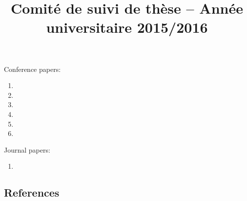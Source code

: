 \documentclass[10pt]{extarticle}
\title{Comité de suivi de thèse – Année universitaire 2015/2016}
\date{\vspace{-10ex}}
\begin{document}
Conference papers:
\begin{enumerate}
	\itemsep 5pt
    \item {}
    \item {}
    \item {}
    \item {}
    \item {}
    \item {}
\end{enumerate}
Journal papers:
\begin{enumerate}
	\itemsep 5pt
     \item {}
\end{enumerate}


\newpage

\begin{small}
\subsection*{References}
\renewcommand{\refname}{}
\vspace{-0.8cm}


\end{small}
\end{document}
